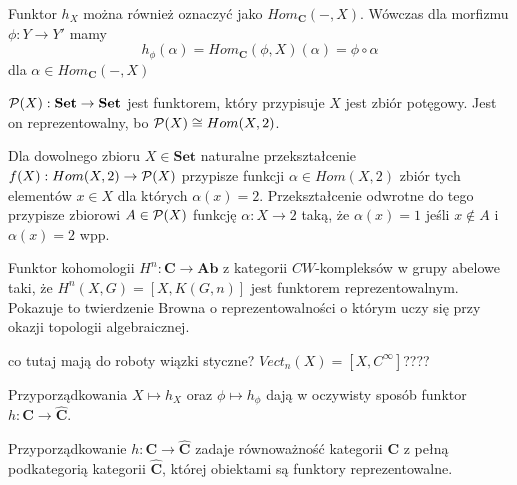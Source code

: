 Funktor $h_X$ można również oznaczyć jako $Hom_{\mathbf{C}}(-, X)$. Wówczas dla morfizmu $\phi:Y\to Y'$ mamy 
$$h_\phi(\alpha)=Hom_{\mathbf{C}}(\phi, X)(\alpha)=\phi\circ\alpha$$
dla $\alpha\in Hom_{\mathbf{C}}(-, X)$

\begin{example}
  \item $\mathcal{P}(X):\mathbf{Set}\to\mathbf{Set}$ jest funktorem, który przypisuje $X$ jest zbiór potęgowy. Jest on reprezentowalny, bo $\mathcal{P}(X)\cong Hom(X, 2)$.
    
    Dla dowolnego zbioru $X\in\mathbf{Set}$ naturalne przekształcenie $f(X):Hom(X, 2)\to \mathcal{P}(X)$ przypisze funkcji $\alpha\in Hom(X, 2)$ zbiór tych elementów $x\in X$ dla których $\alpha(x) = 2$. Przekształcenie odwrotne do tego przypisze zbiorowi $A\in\mathcal{P}(X)$ funkcję $\alpha:X\to 2$ taką, że $\alpha(x)=1$ jeśli $x\notin A$ i $\alpha(x)=2$ wpp.

  \item Funktor kohomologii $H^n:\mathbf{C}\to\mathbf{Ab}$ z kategorii $CW$-kompleksów w grupy abelowe taki, że $H^n(X,G)=[X,K(G, n)]$ jest funktorem reprezentowalnym. Pokazuje to twierdzenie Browna o reprezentowalności o którym uczy się przy okazji topologii algebraicznej.
  
  \item {\large\color{red}co tutaj mają do roboty wiązki styczne?} $Vect_n(X)=[X,C^\infty]$????
\end{example}

Przyporządkowania $X\mapsto h_X$ oraz $\phi\mapsto h_\phi$ dają w oczywisty sposób funktor $h:\mathbf{C}\to\mathbf{\hat{C}}$.

\begin{lemma}
  Przyporządkowanie $h:\mathbf{C}\to\mathbf{\hat{C}}$ zadaje równoważność kategorii $\mathbf{C}$ z pełną podkategorią kategorii $\mathbf{\hat{C}}$, której obiektami są funktory reprezentowalne.
\end{lemma}

